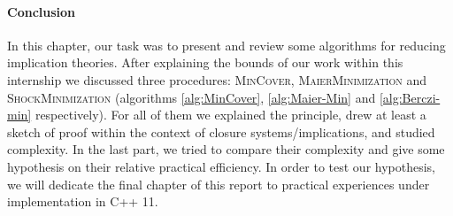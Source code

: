 \vspace{1.2em}

\paragraph{Conclusion} In this chapter, our task was to present and review 
some algorithms for reducing implication theories. After explaining the bounds
of our work within this internship we discussed three procedures: 
\textsc{MinCover}, \textsc{MaierMinimization} and \textsc{ShockMinimization} 
(algorithms \ref{alg:MinCover}, \ref{alg:Maier-Min} and \ref{alg:Berczi-min} 
respectively). For all of them we explained the principle, drew at least a 
sketch of proof within the context of closure systems/implications, and studied
complexity. In the last part, we tried to compare their complexity and give
some hypothesis on their relative practical efficiency. In order to test our
hypothesis, we will dedicate the final chapter of this report to practical 
experiences under implementation in C++ 11.



